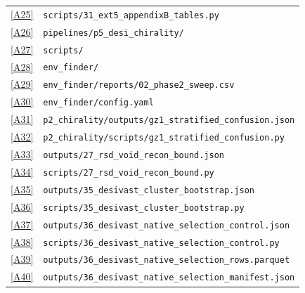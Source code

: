 \documentclass[aps,prd,twocolumn,superscriptaddress,showpacs,preprintnumbers,nofootinbib,longbibliography,floatfix]{revtex4-2}
\newcommand{\repoBase}{https://github.com/Hubify-Projects/bigbounce/blob/main}
\begin{document}
\begin{table}[h!]
{\begin{ruledtabular}
\begin{tabular}{lp{}}
\href{\repoBase/pipelines/p5\_desi\_chirality/scripts/31\_ext5\_appendixB\_tables.py}{[A25]} & \texttt{scripts/31\_ext5\_appendixB\_tables.py} \\
\href{\repoBase/pipelines/p5\_desi\_chirality/}{[A26]} & \texttt{pipelines/p5\_desi\_chirality/} \\
\href{\repoBase/pipelines/p5\_desi\_chirality/scripts/}{[A27]} & \texttt{scripts/} \\
\href{\repoBase/pipelines/p5\_desi\_chirality/env\_finder/}{[A28]} & \texttt{env\_finder/} \\
\href{\repoBase/pipelines/p5\_desi\_chirality/env\_finder/reports/02\_phase2\_sweep.csv}{[A29]} & \texttt{env\_finder/reports/02\_phase2\_sweep.csv} \\
\href{\repoBase/pipelines/p5\_desi\_chirality/env\_finder/config.yaml}{[A30]} & \texttt{env\_finder/config.yaml} \\
\href{\repoBase/pipelines/p2\_chirality/outputs/gz1\_stratified\_confusion.json}{[A31]} & \texttt{p2\_chirality/outputs/gz1\_stratified\_confusion.json} \\
\href{\repoBase/pipelines/p2\_chirality/scripts/gz1\_stratified\_confusion.py}{[A32]} & \texttt{p2\_chirality/scripts/gz1\_stratified\_confusion.py} \\
\href{\repoBase/pipelines/p5\_desi\_chirality/outputs/27\_rsd\_void\_recon\_bound.json}{[A33]} & \texttt{outputs/27\_rsd\_void\_recon\_bound.json} \\
\href{\repoBase/pipelines/p5\_desi\_chirality/scripts/27\_rsd\_void\_recon\_bound.py}{[A34]} & \texttt{scripts/27\_rsd\_void\_recon\_bound.py} \\
\href{\repoBase/pipelines/p5\_desi\_chirality/outputs/35\_desivast\_cluster\_bootstrap.json}{[A35]} & \texttt{outputs/35\_desivast\_cluster\_bootstrap.json} \\
\href{\repoBase/pipelines/p5\_desi\_chirality/scripts/35\_desivast\_cluster\_bootstrap.py}{[A36]} & \texttt{scripts/35\_desivast\_cluster\_bootstrap.py} \\
\href{\repoBase/pipelines/p5\_desi\_chirality/outputs/36\_desivast\_native\_selection\_control.json}{[A37]} & \texttt{outputs/36\_desivast\_native\_selection\_control.json} \\
\href{\repoBase/pipelines/p5\_desi\_chirality/scripts/36\_desivast\_native\_selection\_control.py}{[A38]} & \texttt{scripts/36\_desivast\_native\_selection\_control.py} \\
\href{\repoBase/pipelines/p5\_desi\_chirality/outputs/36\_desivast\_native\_selection\_rows.parquet}{[A39]} & \texttt{outputs/36\_desivast\_native\_selection\_rows.parquet} \\
\href{\repoBase/pipelines/p5\_desi\_chirality/outputs/36\_desivast\_native\_selection\_manifest.json}{[A40]} & \texttt{outputs/36\_desivast\_native\_selection\_manifest.json} \\
\end{tabular}
\end{ruledtabular}
}%
\end{table}
\clearpage
\end{document}
